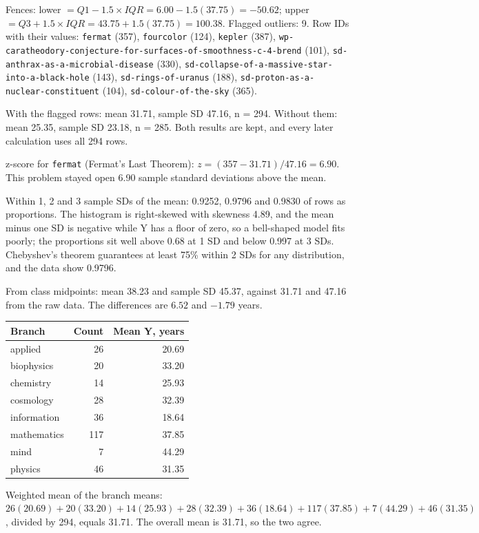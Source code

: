 \documentclass[11pt]{article}
\begin{document}
Fences: lower $= Q1 - 1.5 \times IQR = 6.00 - 1.5(37.75) = -50.62$; upper $= Q3 + 1.5 \times IQR = 43.75 + 1.5(37.75) = 100.38$. Flagged outliers: 9. Row IDs with their values: \texttt{fermat} (357), \texttt{fourcolor} (124), \texttt{kepler} (387), \texttt{wp-caratheodory-conjecture-for-surfaces-of-smoothness-c-4-brend} (101), \texttt{sd-anthrax-as-a-microbial-disease} (330), \texttt{sd-collapse-of-a-massive-star-into-a-black-hole} (143), \texttt{sd-rings-of-uranus} (188), \texttt{sd-proton-as-a-nuclear-constituent} (104), \texttt{sd-colour-of-the-sky} (365).

With the flagged rows: mean 31.71, sample SD 47.16, n = 294. Without them: mean 25.35, sample SD 23.18, n = 285. Both results are kept, and every later calculation uses all 294 rows.

z-score for \texttt{fermat} (Fermat's Last Theorem): $z = (357 - 31.71) / 47.16 = 6.90$. This problem stayed open 6.90 sample standard deviations above the mean.

Within 1, 2 and 3 sample SDs of the mean: 0.9252, 0.9796 and 0.9830 of rows as proportions. The histogram is right-skewed with skewness 4.89, and the mean minus one SD is negative while Y has a floor of zero, so a bell-shaped model fits poorly; the proportions sit well above 0.68 at 1 SD and below 0.997 at 3 SDs. Chebyshev's theorem guarantees at least 75\% within 2 SDs for any distribution, and the data show 0.9796.

From class midpoints: mean 38.23 and sample SD 45.37, against 31.71 and 47.16 from the raw data. The differences are $6.52$ and $-1.79$ years.

\begin{center}\begin{tabular}{lrr}
\toprule
Branch & Count & Mean Y, years \\
\midrule
applied & 26 & 20.69 \\
biophysics & 20 & 33.20 \\
chemistry & 14 & 25.93 \\
cosmology & 28 & 32.39 \\
information & 36 & 18.64 \\
mathematics & 117 & 37.85 \\
mind & 7 & 44.29 \\
physics & 46 & 31.35 \\
\bottomrule
\end{tabular}\end{center}

Weighted mean of the branch means: $26(20.69) + 20(33.20) + 14(25.93) + 28(32.39) + 36(18.64) + 117(37.85) + 7(44.29) + 46(31.35)$, divided by 294, equals 31.71. The overall mean is 31.71, so the two agree.
\end{document}
